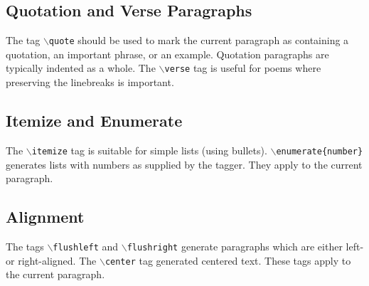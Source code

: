 \documentclass[11pt]{article}
\newcommand{\cmd}[1]{{\tt $\backslash$#1}}
\begin{document}
\subsection{Quotation and Verse Paragraphs}

The tag \cmd{quote} should be used to mark the current paragraph as
containing a quotation, an important phrase, or an example. Quotation
paragraphs are typically indented as a whole. The \cmd{verse} tag is
useful for poems where preserving the linebreaks is important.




\subsection{Itemize and Enumerate}

The \cmd{itemize} tag is suitable for simple lists (using
bullets). \cmd{enumerate\{number\}} generates lists with numbers as
supplied by the tagger. They apply to the current paragraph.



\subsection{Alignment}

The tags \cmd{flushleft} and \cmd{flushright} generate paragraphs
which are either left- or right-aligned. The \cmd{center} tag
generated centered text. These tags apply to the current paragraph.


\end{document}
